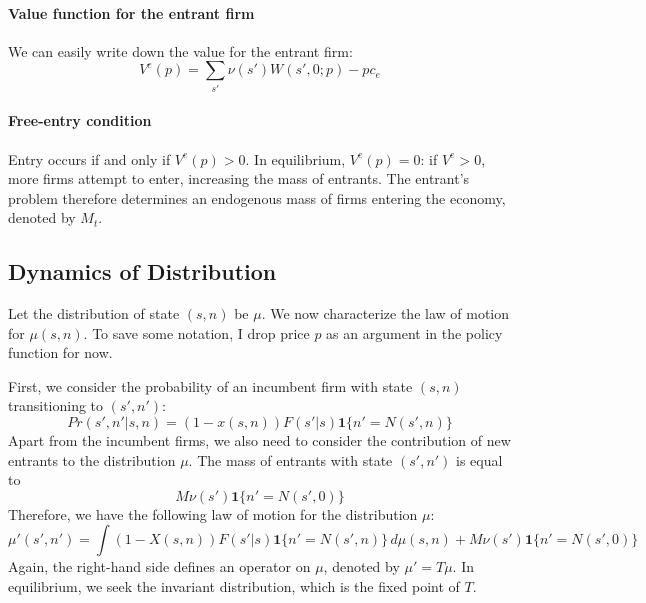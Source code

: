 \documentclass[12pt]{article}
\begin{document}
\paragraph{Value function for the entrant firm} We can easily write down the value for the entrant firm:
\begin{equation}
	V^e(p) = \sum_{s'} \nu(s') W(s',0;p) - p c_e 
\end{equation}

\paragraph{Free-entry condition} Entry occurs if and only if $V^e(p) > 0$. In equilibrium, $V^e(p) = 0$: if $V^e > 0$, more firms attempt to enter, increasing the mass of entrants. The entrant's problem therefore determines an endogenous mass of firms entering the economy, denoted by $M_t$.

\subsection{Dynamics of Distribution}
Let the distribution of state $(s,n)$ be $\mu$. We now characterize the law of motion for $\mu(s,n)$. To save some notation, I drop price $p$ as an argument in the policy function for now.

First, we consider the probability of an incumbent firm with state $(s,n)$ transitioning to $(s',n')$:
\begin{equation}
	Pr(s',n'|s,n) = (1-x(s,n))  F(s'|s) \mathbf{1}\{n' = N(s',n)\}
\end{equation}
Apart from the incumbent firms, we also need to consider the contribution of new entrants to the distribution $\mu$. The mass of entrants with state $(s',n')$ is equal to
\begin{equation}
	M \nu(s') \mathbf{1}\{n' = N(s', 0)\}
\end{equation}
Therefore, we have the following law of motion for the distribution $\mu$:
\begin{equation} \label{eq:distribution_transition}
	\mu'(s',n') = \int (1-X(s,n))  F(s'|s) \mathbf{1}\{n' = N(s',n)\} \, d\mu(s,n) + M \nu(s') \mathbf{1}\{n' = N(s', 0)\} 
\end{equation}
Again, the right-hand side defines an operator on $\mu$, denoted by $\mu' = T\mu$. In equilibrium, we seek the invariant distribution, which is the fixed point of $T$.
\end{document}
